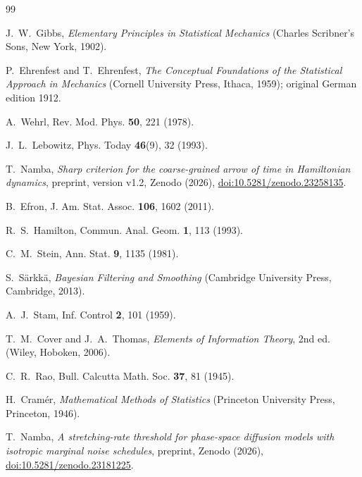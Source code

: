 \begin{thebibliography}{99}

J.~W.~Gibbs, \textit{Elementary Principles in Statistical Mechanics} (Charles Scribner's Sons, New York, 1902).

P.~Ehrenfest and T.~Ehrenfest, \textit{The Conceptual Foundations of the Statistical Approach in Mechanics} (Cornell University Press, Ithaca, 1959); original German edition 1912.

A.~Wehrl, Rev. Mod. Phys. \textbf{50}, 221 (1978).

J.~L.~Lebowitz, Phys. Today \textbf{46}(9), 32 (1993).

T.~Namba, \textit{Sharp criterion for the coarse-grained arrow of time in Hamiltonian dynamics}, preprint, version v1.2, Zenodo (2026), \href{https://doi.org/10.5281/zenodo.23258135}{doi:10.5281/zenodo.23258135}.

B.~Efron, J. Am. Stat. Assoc. \textbf{106}, 1602 (2011).

R.~S.~Hamilton, Commun. Anal. Geom. \textbf{1}, 113 (1993).

C.~M.~Stein, Ann. Stat. \textbf{9}, 1135 (1981).

S.~S\"arkk\"a, \textit{Bayesian Filtering and Smoothing} (Cambridge University Press, Cambridge, 2013).

A.~J.~Stam, Inf. Control \textbf{2}, 101 (1959).

T.~M.~Cover and J.~A.~Thomas, \textit{Elements of Information Theory}, 2nd ed. (Wiley, Hoboken, 2006).

C.~R.~Rao, Bull. Calcutta Math. Soc. \textbf{37}, 81 (1945).

H.~Cram\'er, \textit{Mathematical Methods of Statistics} (Princeton University Press, Princeton, 1946).

T.~Namba, \textit{A stretching-rate threshold for phase-space diffusion models with isotropic marginal noise schedules}, preprint, Zenodo (2026), \href{https://doi.org/10.5281/zenodo.23181225}{doi:10.5281/zenodo.23181225}.

\end{thebibliography}
